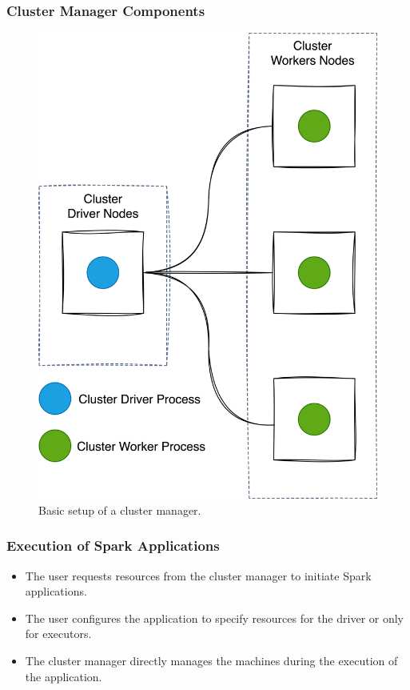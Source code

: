 \begin{frame}
    \frametitle{Cluster Manager Components}
    \begin{figure}
        \includegraphics[width=\textwidth,height=.7\textheight,keepaspectratio]{./Figures/chapter-04/cluster_manager_processes}
        \caption{Basic setup of a cluster manager.}\label{fig:cluster_manager_processes}
    \end{figure}
\end{frame}

\begin{frame}
    \frametitle{Execution of Spark Applications}
    \begin{itemize}
        \item The user requests resources from the cluster manager to initiate Spark applications.
        \item The user configures the application to specify resources for the driver or only for executors.
        \item The cluster manager directly manages the machines during the execution of the application.
    \end{itemize}
\end{frame}

